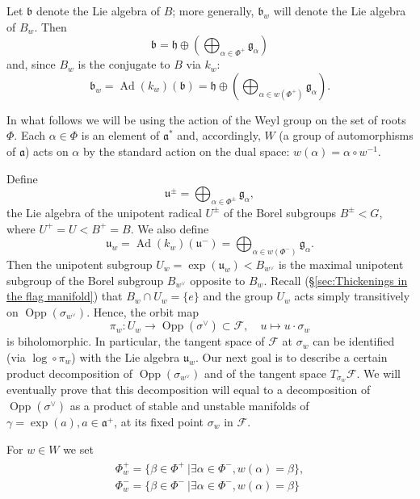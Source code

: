 \documentclass[12pt]{amsbook}%
\theoremstyle{definition}
\theoremstyle{remark}
\numberwithin{section}{chapter}
\numberwithin{subsection}{section}
\numberwithin{figure}{chapter}
\DeclareMathOperator{\Opp}{Opp}
\DeclareMathOperator{\Ad}{Ad}
\def\cF{{\mathscr{F}}}
\def\kap{}
\begin{document}
{{Let $\mathfrak{b}$ denote the Lie algebra of $B$; more generally, $\mathfrak{b}_w$ will denote the Lie algebra 
of $B_w$. Then 
$$
\mathfrak{b}=\mathfrak{h}\oplus\left(\bigoplus_{\alpha\in \Phi^+}{\mathfrak g}_{\alpha}\right)$$ 
and, since $B_w$ is the conjugate to $B$ via $k_w$: 
\[
\mathfrak{b}_w=\Ad(k_w)(\mathfrak{b})=\mathfrak{h}\oplus\left(\bigoplus_{\alpha\in w(\Phi^+)}{\mathfrak g}_{\alpha}\right).
\]





In what follows we will be using the action of the Weyl group on the set of roots $\Phi$. 
Each $\alpha\in \Phi$ is an element of ${\mathfrak a}^*$ and, accordingly, $W$ 
(a group of automorphisms of ${\mathfrak a}$) 
acts on $\alpha$ by  the standard action on the dual space: $w(\alpha)= \alpha\circ w^{-1}$.

Define  
$$
{\mathfrak u}^\pm= 
\bigoplus_{\alpha\in \Phi^\pm}{\mathfrak g}_{\alpha},$$
the Lie algebra of the unipotent radical $U^\pm$ of the Borel subgroups $B^\pm< G$,  where $U^+=U< B^+=B$. We also define 
\[
\mathfrak{u}_w=\Ad(k_w)(\mathfrak{u}^-)=\bigoplus_{\alpha\in w(\Phi^-)}{\mathfrak g}_{\alpha}.
\]
Then the unipotent subgroup $U_w=\exp(\mathfrak{u}_w) < B_{w^\vee}$ is the maximal unipotent subgroup of the Borel subgroup 
$B_{w^\vee}$ opposite to $B_w$. Recall (\S \ref{sec:Thickenings in the flag manifold}) that $B_w\cap U_w=\{e\}$ 
and the group $U_{w}$ acts simply transitively on $\Opp(\sigma_{w^\vee})$. Hence, the orbit map  
\[
\pi_w: U_w\rightarrow \Opp(\sigma^\vee)\subset \cF, \quad u\mapsto u\cdot \sigma_w
\]
is biholomorphic. %
In particular, the tangent space of $\cF$ at $\sigma_w$ can be identified (via $\log\circ \pi_w$) with the Lie algebra 
$\mathfrak{u}_w$. 
Our next goal is to describe a certain product decomposition of $\Opp(\sigma_{w^\vee})$ and of the tangent space $T_{\sigma_w} \cF$. We will eventually prove that this decomposition will equal to a decomposition of $\Opp(\sigma^\vee)$ as a product of stable and unstable manifolds of $\gamma=\exp(a), a\in {\mathfrak a}^+$, at its fixed point $\sigma_w$ in $\cF$.  

\medskip 
For $w\in W$ we set
\begin{align}
\begin{aligned}
\label{eq_roots_w}
\Phi_w^+ = \{ \beta \in \Phi^+ \ | \exists \alpha \in \Phi^-, w(\alpha)=\beta\},\\
\Phi_w^- = \{ \beta \in \Phi^- \ | \exists \alpha \in \Phi^-, w(\alpha)=\beta \}
\end{aligned}
\end{align} 


}}
\end{document}
